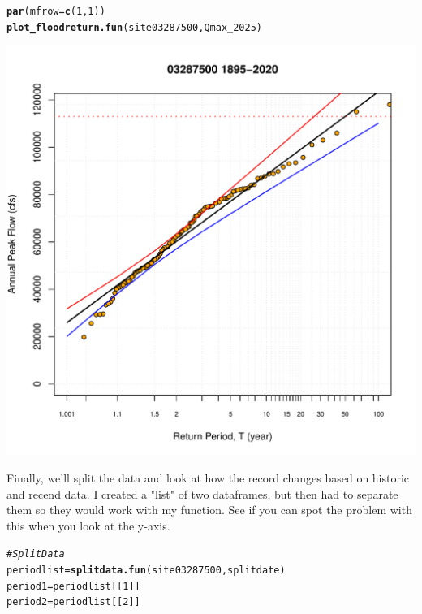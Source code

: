 \documentclass{tufte-handout}\usepackage[]{graphicx}\usepackage[]{xcolor}
\makeatletter
\def\maxwidth{ %
  \ifdim\Gin@nat@width>\linewidth
    \linewidth
  \else
    \Gin@nat@width
  \fi
}
\newcommand{\hlnum}[1]{\textcolor[rgb]{0.686,0.059,0.569}{#1}}%
\newcommand{\hlcom}[1]{\textcolor[rgb]{0.678,0.584,0.686}{\textit{#1}}}%
\newcommand{\hlstd}[1]{\textcolor[rgb]{0.345,0.345,0.345}{#1}}%
\newcommand{\hlkwb}[1]{\textcolor[rgb]{0.69,0.353,0.396}{#1}}%
\newcommand{\hlkwc}[1]{\textcolor[rgb]{0.333,0.667,0.333}{#1}}%
\newcommand{\hlkwd}[1]{\textcolor[rgb]{0.737,0.353,0.396}{\textbf{#1}}}%
\newenvironment{kframe}{%
 \def\at@end@of@kframe{}%
 \ifinner\ifhmode%
  \def\at@end@of@kframe{\end{minipage}}%
  \begin{minipage}{\columnwidth}%
 \fi\fi%
 \def\FrameCommand##1{\hskip\@totalleftmargin \hskip-\fboxsep
 \colorbox{shadecolor}{##1}\hskip-\fboxsep
     \hskip-\linewidth \hskip-\@totalleftmargin \hskip\columnwidth}%
 \MakeFramed {\advance\hsize-\width
   \@totalleftmargin\z@ \linewidth\hsize
   \@setminipage}}%
 {\par\unskip\endMakeFramed%
 \at@end@of@kframe}
\newenvironment{knitrout}{}{} %
\makeatother
\begin{document}
\begin{knitrout}
\color{fgcolor}\begin{kframe}
\begin{alltt}
\hlkwd{par}\hlstd{(}\hlkwc{mfrow}\hlstd{=}\hlkwd{c}\hlstd{(}\hlnum{1}\hlstd{,}\hlnum{1}\hlstd{))}
\hlkwd{plot_floodreturn.fun}\hlstd{(site03287500, Qmax_2025)}
\end{alltt}
\end{kframe}
\includegraphics[width=\maxwidth]{figure/unnamed-chunk-18-1} 
\end{knitrout}

Finally, we'll split the data and look at how the record changes based on historic and recend data. I created a "list" of two dataframes, but then had to separate them so they would work with my function. See if you can spot the problem with this when you look at the y-axis.

\begin{knitrout}
\color{fgcolor}\begin{kframe}
\begin{alltt}
\hlcom{# Split Data}
\hlstd{periodlist} \hlkwb{=} \hlkwd{splitdata.fun}\hlstd{(site03287500, splitdate)}
\hlstd{period1} \hlkwb{=} \hlstd{periodlist[[}\hlnum{1}\hlstd{]]}
\hlstd{period2} \hlkwb{=} \hlstd{periodlist[[}\hlnum{2}\hlstd{]]}
\end{alltt}
\end{kframe}
\end{knitrout}
\end{document}

